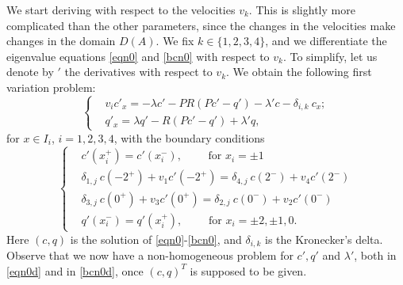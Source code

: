 \documentclass[a4paper]{article}
\numberwithin{equation}{section}
\begin{document}
We start deriving with respect to the velocities $v_k$. This is slightly more complicated than the other parameters, since the changes in the velocities make changes in the domain $D(A)$.
We fix $k\in\{1,2,3,4\}$, and we differentiate the eigenvalue equations \eqref{eqn0} and \eqref{bcn0} with respect to $v_k$. To simplify, let us denote by $'$ the derivatives with respect to $v_k$. We obtain the following first variation problem:
\begin{equation}\label{eqn0d}
\left\{ \begin{array}{ll}
&v_i c'_x=-\lambda c'-PR(Pc'-q')-\lambda'c-\delta_{i,k}\ c_x; \\
&q'_x=\lambda q'-R(Pc'-q')+\lambda'q,
\end{array}\right.
\end{equation}
for $x\in I_i$, $i=1,2,3,4$, with the boundary conditions
\begin{equation}\label{bcn0d}
\left\{
\begin{array}{ll}
&c'(x_i^+)=c'(x_i^-), \qquad\textrm{ for }x_i=\pm 1\\
&\delta_{1,j}\ c(-2^+)+v_1 c'(-2^+)=\delta_{4,j}\ c(2^-)+v_4c'(2^-)\\
&\delta_{3,j}\ c(0^+)+v_3 c'(0^+)=\delta_{2,j}\ c(0^-)+v_2 c'(0^-)\\
&q'(x_i^-)=q'(x_i^+), \qquad\textrm{ for } x_i=\pm 2, \pm 1, 0.
\end{array}
\right.
\end{equation}
Here $(c,q)$ is the solution of \eqref{eqn0}-\eqref{bcn0}, and $\delta_{i,k}$ is the Kronecker's delta. Observe that we now have a non-homogeneous problem for $c', q'$ and $\lambda'$, both in \eqref{eqn0d} and in \eqref{bcn0d}, once  $(c,q)^T$ is supposed to be given.
\end{document}
